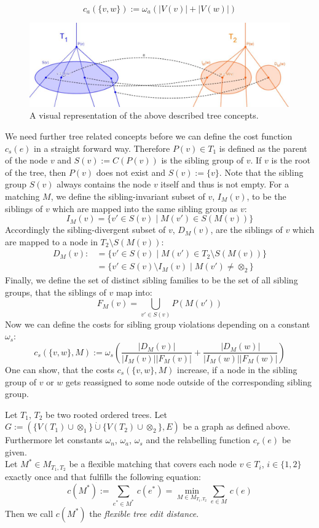 $$c_a(\{v,w\}) := \omega_a (|V(v)| + |V(w)|)$$
\begin{figure}[b!]
    \centering
        \includegraphics[width=\textwidth]{figures/Treeconcepts_flexible_tree_matching.png}
        \caption{A visual representation of the above described tree concepts.}
        \label{fig:treeConcepts}
\end{figure}
We need further tree related concepts before we can define the cost function $c_s(e)$ in a straight forward way. Therefore $P(v) \in T_1$ is defined as the parent of the node $v$ and $S(v):=C(P(v))$ is the sibling group of $v$. If $v$ is the root of the tree, then $P(v)$ does not exist and $S(v):=\{v\}$. Note that the sibling group $S(v)$ always contains the node $v$ itself and thus is not empty. For a matching $M$, we define the sibling-invariant subset of $v$, $I_M(v)$, to be the siblings of $v$ which are mapped into the same sibling group as $v$:
$$I_M(v) = \{v' \in S(v)\;|\;M(v') \in S(M(v))\}$$
Accordingly the sibling-divergent subset of $v$, $D_M(v)$, are the siblings of $v$ which are mapped to a node in $T_2 \setminus S(M(v))$:
\begin{align*}
D_M(v) :&= \{v' \in S(v)\;|\;M(v') \in T_2 \setminus S(M(v))\} \\
		&= \{v' \in S(v) \setminus I_M(v)\;|\;M(v') \neq \otimes_2\}
\end{align*}
Finally, we define the set of distinct sibling families to be the set of all sibling groups, that the siblings of $v$ map into:
$$F_M(v) = \bigcup_{v' \in S(v)} P(M(v'))$$
Now we can define the costs for sibling group violations depending on a constant $\omega_s$:
$$c_s(\{v,w\},M) := \omega_s (\frac{|D_M(v)|}{|I_M(v)||F_M(v)|} + \frac{|D_M(w)|}{|I_M(w)||F_M(w)|})$$
One can show, that the costs $c_s(\{v,w\},M)$ increase, if a node in the sibling group of $v$ or $w$ gets reassigned to some node outside of the corresponding sibling group.

\begin{defin}
Let $T_1$, $T_2$ be two rooted ordered trees. Let $G := (\{V(T_1)\cup \otimes_1\} \dot{\cup} \{V(T_2)\cup \otimes_2\}, E)$ be a graph as defined above. Furthermore let constants $\omega_n$, $\omega_a$, $\omega_s$ and the relabelling function $c_r(e)$ be given.\\
Let $M^* \in M_{T_1, T_2}$ be a flexible matching that covers each node $v \in T_i$, $i \in \{1,2\}$ exactly once and that fulfills the following equation:
$$c(M^*) := \sum_{e^* \in M^*} \, c(e^*) = \min_{M \in M_{T_1, T_2}} \sum_{e \in M} \, c(e)
$$
Then we call $c(M^*)$ the \textit{flexible tree edit distance}.
\end{defin}


